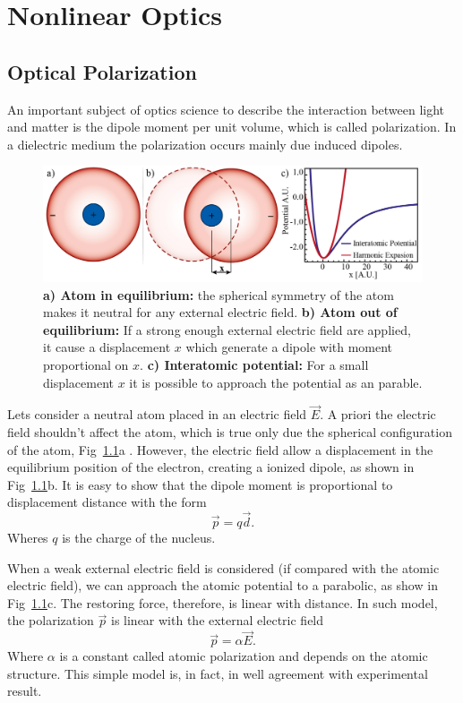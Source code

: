 \chapter{Nonlinear Optics}

\section{Optical Polarization}
An important subject of optics science to describe the interaction between light and matter is the dipole moment per unit volume, which is called polarization. In a dielectric medium the polarization occurs mainly due induced dipoles.

\begin{figure}[h!]
    \centering
    \includegraphics[width = 16cm]{figuras/Dissertation_atomic_polarization.jpg}
    \caption{\textbf{a) Atom in equilibrium:} the spherical symmetry of the atom makes it neutral for any external electric field. \textbf{b) Atom out of equilibrium:} If a strong enough external electric field are applied, it cause a displacement $x$ which generate a dipole with moment proportional on $x$. \textbf{c) Interatomic potential:} For a small displacement $x$ it is possible to approach the potential as an parable.}
    \label{fig:polarization}
\end{figure}
Lets consider a neutral atom placed in an electric field $\vec{E}$. A priori the electric field shouldn't affect the atom, which is true only due the spherical configuration of the atom, Fig~\ref{fig:polarization}a
. However, the electric field allow a displacement in the equilibrium position of the electron, creating a ionized dipole, as shown in Fig~\ref{fig:polarization}b. It is easy to show that the dipole moment is proportional to displacement distance with the form
\begin{equation}
    \vec{p} = q\vec{d}.
\end{equation}
Wheres $q$ is the charge of the nucleus. 

When a weak external electric field is considered (if compared with the atomic electric field), we can approach the atomic potential to a parabolic, as show in Fig~\ref{fig:polarization}c. The restoring force, therefore, is linear with distance. In such model, the polarization $\vec{p}$ is linear with the external electric field
\begin{equation}
    \vec{p} = \alpha \vec{E}.
\end{equation}
Where $\alpha$ is a constant called atomic polarization and depends on the atomic structure. This simple model is, in fact, in well agreement with experimental result.  

